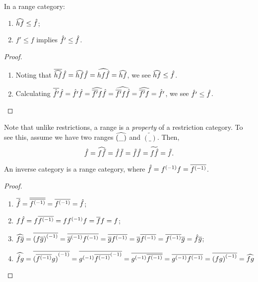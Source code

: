 \begin{lemma}\label{lem:ordering_of_restriction_and_range}
  In a range category:
  \begin{multicols}{2}
    \begin{enumerate}[{(}i{)}]
      \item  $\widehat{h f} \le \hat{f}$; \label{lemitem:ordering_1}
      \item $f' \le f$ implies $\hat{f'} \le \hat{f}$. \label{lemitem:ordering_2}
    \end{enumerate}
  \end{multicols}
\end{lemma}
\begin{proof}
  \prepprooflist
  \begin{enumerate}[{(}i{)}]
    \item Noting that $\overline{\widehat{hf}} \hat{f} = \widehat{hf} \hat{f}  = \widehat{hf \hat{f}} = \widehat{h f}$,
      we see $\widehat{h f} \le \hat{f}$.
    \item Calculating $\overline{\hat{f'}} \hat{f} = \hat{f'} \hat{f} = \widehat{\overline{f'} f} \hat{f} =
      \widehat{\overline{f'} f \hat{f}} = \widehat{\overline{f'} f} = \hat{f'}$, we see $\hat{f'} \le \hat{f}$.
  \end{enumerate}
\end{proof}

\begin{remark}
  Note that unlike restrictions, a range is a \emph{property} of a restriction category. To see
  this, assume we have two ranges $\widehat{(\_)}$ and $\widetilde{(\_)}$. Then,
  \[\hat{f}=\widehat{f \tilde{f}}=\hat{f} \tilde{f}=\tilde{f} \hat{f}=\widetilde{f \hat{f}}=\tilde{f}.\]
\end{remark}
\begin{lemma}\label{lem:inverse_categories_are_range_categories}
  An inverse category \X is a range category, where $\hat{f} = {f}^{(-1)}f = \overline{{f}^{(-1)}}$.
\end{lemma}
\begin{proof}
  \prepprooflist
  \begin{enumerate}
    \item[\rrone] $\overline{\hat{f}} = \overline{\overline{{f}^{(-1)}}} = \overline{{f}^{(-1)}} = \hat{f}$;
    \item[\rrtwo] $f \hat{f} = f \overline{{f}^{(-1)}} = f {f}^{(-1)} f = \overline{f} f = f$;
    \item[\rrthree] $\widehat{f\overline{g}} = \overline{{(f\overline{g})}^{(-1)}} = \overline{{\overline{g}}^{(-1)} {f}^{(-1)}} =
      \overline{\overline{g} {f}^{(-1)}} =
      \overline{g} \overline{{f}^{(-1)}} = \overline{{f}^{(-1)}} \overline{g} =\hat{f} \overline{g}$;
    \item[\rrfour]  $\widehat{\hat{f}g} = \overline{{(\overline{{f}^{(-1)}} g)}^{(-1)}} =
      \overline{{g}^{(-1)}{\overline{{f}^{(-1)}}}^{(-1)}} = \overline{{g}^{(-1)} \overline{{f}^{(-1)}}} =
      \overline{{g}^{(-1)} {f}^{(-1)}} = \overline{{(f g)}^{(-1)}} = \widehat{f g}$
  \end{enumerate}
\end{proof}

